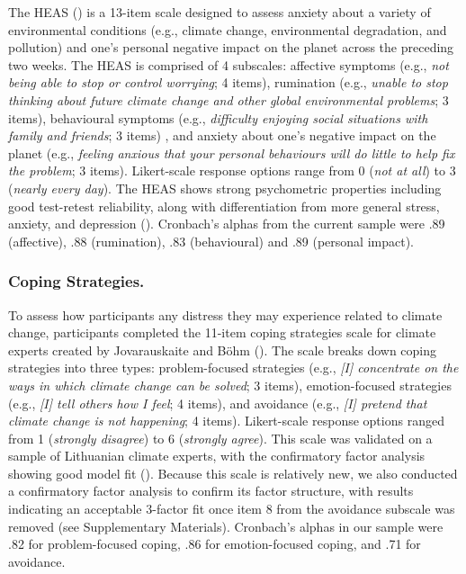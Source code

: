 \documentclass[
  man,
  longtable,
  nolmodern,
  notxfonts,
  notimes,
  colorlinks=true,linkcolor=blue,citecolor=blue,urlcolor=blue]{apa7}
\begin{document}
The HEAS () is a 13-item
scale designed to assess anxiety about a variety of environmental
conditions (e.g., climate change, environmental degradation, and
pollution) and one's personal negative impact on the planet across the
preceding two weeks. The HEAS is comprised of 4 subscales: affective
symptoms (e.g., \emph{not being able to stop or control worrying}; 4
items), rumination (e.g., \emph{unable to stop thinking about future
climate change and other global environmental problems}; 3 items),
behavioural symptoms (e.g., \emph{difficulty enjoying social situations
with family and friends}; 3 items) , and anxiety about one's negative
impact on the planet (e.g., \emph{feeling anxious that your personal
behaviours will do little to help fix the problem}; 3 items).
Likert-scale response options range from 0 (\emph{not at all}) to 3
(\emph{nearly every day}). The HEAS shows strong psychometric properties
including good test-retest reliability, along with differentiation from
more general stress, anxiety, and depression
(). Cronbach's
alphas from the current sample were .89 (affective), .88 (rumination),
.83 (behavioural) and .89 (personal impact).

\subsubsection{Coping Strategies.}\label{coping-strategies.}

To assess how participants any distress they may experience related to
climate change, participants completed the 11-item coping strategies
scale for climate experts created by Jovarauskaite and Böhm
(). The scale breaks
down coping strategies into three types: problem-focused strategies
(e.g., \emph{{[}I{]} concentrate on the ways in which climate change can
be solved}; 3 items), emotion-focused strategies (e.g., \emph{{[}I{]}
tell others how I feel}; 4 items), and avoidance (e.g., \emph{{[}I{]}
pretend that climate change is not happening}; 4 items). Likert-scale
response options ranged from 1 (\emph{strongly disagree}) to 6
(\emph{strongly agree}). This scale was validated on a sample of
Lithuanian climate experts, with the confirmatory factor analysis
showing good model fit
(). Because this scale is relatively new, we also conducted a
confirmatory factor analysis to confirm its factor structure, with
results indicating an acceptable 3-factor fit once item 8 from the
avoidance subscale was removed (see Supplementary Materials). Cronbach's
alphas in our sample were .82 for problem-focused coping, .86 for
emotion-focused coping, and .71 for avoidance.
\end{document}
